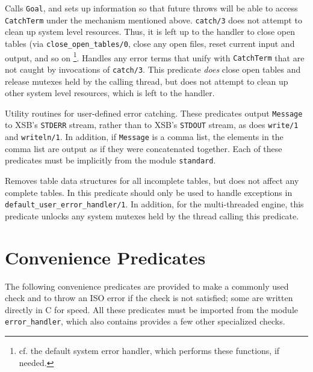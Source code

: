 \begin{description}
%
Calls {\tt Goal}, and sets up information so that future throws will
be able to access {\tt CatchTerm} under the mechanism mentioned
above. {\tt catch/3} does not attempt to clean up system level
resources.  Thus, it is left up to the handler to close open tables
(via {\tt close\_open\_tables/0}, close any open files, reset current
input and output, and so on \footnote{cf. the default system error
  handler, which performs these functions, if needed.}.
%
%
Handles any error terms that unify with {\tt CatchTerm} that are not
caught by invocations of {\tt catch/3}.  This predicate {\em does}
close open tables and release mutexes held by the calling thread, but
does not attempt to clean up other system level resources, which is
left to the handler.
%

%
Utility routines for user-defined error catching.  These predicates
output {\tt Message} to XSB's {\tt STDERR} stream, rather than to
XSB's {\tt STDOUT} stream, as does {\tt write/1} and {\tt writeln/1}.
In addition, if {\tt Message} is a comma list, the elements in the
comma list are output as if they were concatenated together.  Each of
these predicates must be implicitly from the module {\tt standard}.

%
Removes table data structures for all incomplete tables, but does not
affect any complete tables.  In \version{} this predicate should only
be used to handle exceptions in {\tt default\_user\_error\_handler/1}.
In addition, for the multi-threaded engine, this predicate unlocks any
system mutexes held by the thread calling this predicate.

\end{description}

\section{Convenience Predicates}

The following convenience predicates are provided to make a commonly
used check and to throw an ISO error if the check is not satisfied;
some are written directly in C for speed.  All these predicates must
be imported from the module {\tt error\_handler}, which also contains
provides a few other specialized checks.

